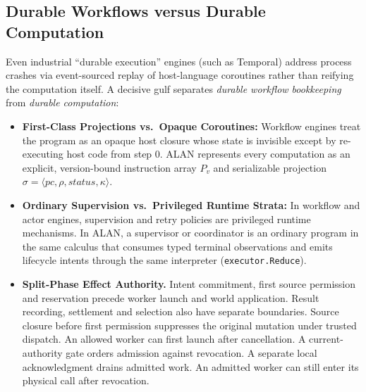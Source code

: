 \documentclass[11pt,a4paper]{article}
\theoremstyle{definition}
\theoremstyle{remark}
\begin{document}
\subsection{Durable Workflows versus Durable Computation}
Even industrial ``durable execution'' engines (such as Temporal) address process crashes via event-sourced replay of host-language coroutines rather than reifying the computation itself. A decisive gulf separates \emph{durable workflow bookkeeping} from \emph{durable computation}:
\begin{itemize}
  \item \textbf{First-Class Projections vs.\ Opaque Coroutines:} Workflow engines treat the program as an opaque host closure whose state is invisible except by re-executing host code from step $0$. ALAN represents every computation as an explicit, version-bound instruction array $P_v$ and serializable projection $\sigma = \langle \mathit{pc}, \rho, \mathit{status}, \kappa \rangle$.
  \item \textbf{Ordinary Supervision vs.\ Privileged Runtime Strata:} In workflow and actor engines, supervision and retry policies are privileged runtime mechanisms. In ALAN, a supervisor or coordinator is an ordinary program in the same calculus that consumes typed terminal observations and emits lifecycle intents through the same interpreter (\texttt{executor.Reduce}).
  \item \textbf{Split-Phase Effect Authority.} Intent commitment, first source permission and reservation precede worker launch and world application. Result recording, settlement and selection also have separate boundaries. Source closure before first permission suppresses the original mutation under trusted dispatch. An allowed worker can first launch after cancellation. A current-authority gate orders admission against revocation. A separate local acknowledgment drains admitted work. An admitted worker can still enter its physical call after revocation.
\end{itemize}
\end{document}
